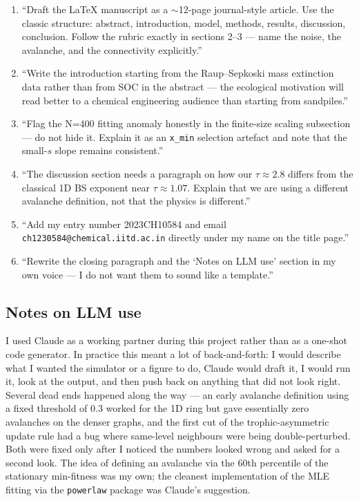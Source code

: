 \documentclass[10pt,a4paper,twocolumn]{article}
\begin{document}
\begin{enumerate}
\subsection*{Phase 6: Manuscript and polish}
\item ``Draft the LaTeX manuscript as a $\sim$12-page journal-style article. Use the classic structure: abstract, introduction, model, methods, results, discussion, conclusion. Follow the rubric exactly in sections 2--3 --- name the noise, the avalanche, and the connectivity explicitly.''
\item ``Write the introduction starting from the Raup--Sepkoski mass extinction data rather than from SOC in the abstract --- the ecological motivation will read better to a chemical engineering audience than starting from sandpiles.''
\item ``Flag the N=400 fitting anomaly honestly in the finite-size scaling subsection --- do not hide it. Explain it as an \texttt{x\_min} selection artefact and note that the small-$s$ slope remains consistent.''
\item ``The discussion section needs a paragraph on how our $\tau \approx 2.8$ differs from the classical 1D BS exponent near $\tau \approx 1.07$. Explain that we are using a different avalanche definition, not that the physics is different.''
\item ``Add my entry number 2023CH10584 and email \texttt{ch1230584@chemical.iitd.ac.in} directly under my name on the title page.''
\item ``Rewrite the closing paragraph and the `Notes on LLM use' section in my own voice --- I do not want them to sound like a template.''
\end{enumerate}

\subsection*{Notes on LLM use}
I used Claude as a working partner during this project rather than as a one-shot code generator. In practice this meant a lot of back-and-forth: I would describe what I wanted the simulator or a figure to do, Claude would draft it, I would run it, look at the output, and then push back on anything that did not look right. Several dead ends happened along the way --- an early avalanche definition using a fixed threshold of 0.3 worked for the 1D ring but gave essentially zero avalanches on the denser graphs, and the first cut of the trophic-asymmetric update rule had a bug where same-level neighbours were being double-perturbed. Both were fixed only after I noticed the numbers looked wrong and asked for a second look. The idea of defining an avalanche via the 60th percentile of the stationary min-fitness was my own; the cleanest implementation of the MLE fitting via the \texttt{powerlaw} package was Claude's suggestion.
\end{document}
